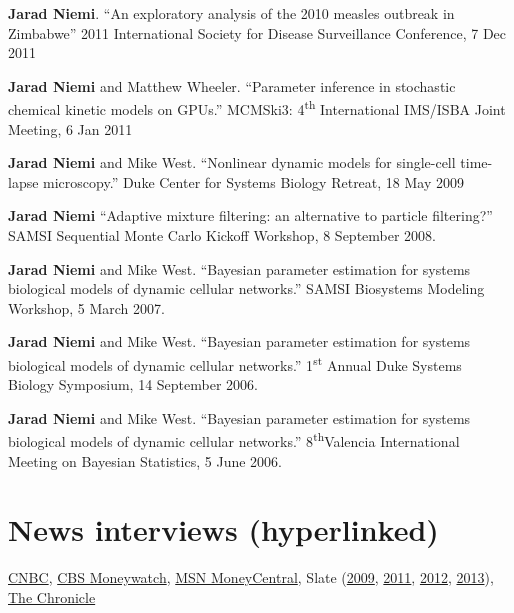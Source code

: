 \documentclass[overlapped,line]{res}
\begin{document}
\begin{resume}
{ 

{\bf Jarad Niemi}. ``An exploratory analysis of the 2010 measles outbreak in Zimbabwe'' 2011 International Society for Disease Surveillance Conference, 7 Dec 2011 

{\bf Jarad Niemi} and Matthew Wheeler. ``Parameter inference in stochastic chemical kinetic models on GPUs.'' MCMSki3: 4\textsuperscript{th} International IMS/ISBA Joint Meeting, 6 Jan 2011

{\bf Jarad Niemi} and Mike West. ``Nonlinear dynamic models for single-cell time-lapse microscopy.'' Duke Center for Systems Biology Retreat, 18 May 2009

{\bf Jarad Niemi} ``Adaptive mixture filtering: an alternative to particle filtering?'' SAMSI Sequential Monte Carlo Kickoff Workshop, 8 September 2008.

{\bf Jarad Niemi} and Mike West. ``Bayesian parameter estimation for systems biological models of dynamic cellular networks.'' SAMSI Biosystems Modeling Workshop, 5 March 2007.

{\bf Jarad Niemi} and Mike West. ``Bayesian parameter estimation for systems biological models of dynamic cellular networks.'' 1\textsuperscript{st} Annual Duke Systems Biology Symposium, 14 September 2006.

{\bf Jarad Niemi} and Mike West. ``Bayesian parameter estimation for systems biological models of dynamic cellular networks.'' 8\textsuperscript{th}Valencia International Meeting on Bayesian Statistics, 5 June 2006.

}



\section{\bf News interviews (hyperlinked)}

\href{http://www.nbcnews.com/business/slam-dunk-your-rivals-office-march-madness-pool-1C8912546}{CNBC}, %
\href{http://moneywatch.bnet.com/economic-news/article/ncaa-brackets-how-to-win-your-march-madness-pool/403055/?tag=main;related-link-0}{CBS Moneywatch}, 
\href{http://articles.moneycentral.msn.com/SmartSpending/blog/page.aspx?post=1704157}{MSN MoneyCentral}, 
Slate (\href{http://www.slate.com/id/2213974/pagenum/all/}{2009}, \href{http://www.slate.com/id/2288234/pagenum/all/}{2011}, 
\href{http://www.slate.com/articles/sports/sports_nut/2012/03/ncaa_basketball_tournament_bracket_act_like_a_hedge_fund_manager_and_pick_ohio_state_to_win_it_all_.single.html}{2012}, 
\href{http://www.slate.com/articles/sports/sports_nut/2012/03/ncaa_basketball_tournament_bracket_act_like_a_hedge_fund_manager_and_pick_ohio_state_to_win_it_all_.single.html}{2013}),
\href{http://dukechronicle.com/node/145805}{The Chronicle}





\end{resume}
\end{document}
